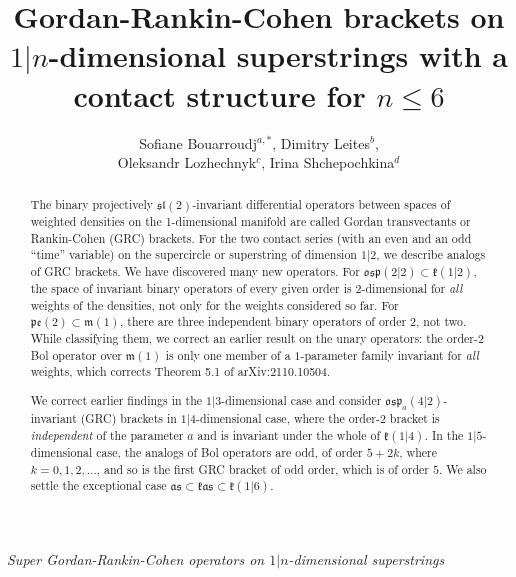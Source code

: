 \documentclass[12pt,a4paper]{amsart}
\title[GRC brackets on $1|n$-dimensional superstrings]{Gordan-Rankin-Cohen  brackets on $1|n$-dimensional superstrings with a contact structure for $n\leq 6$}
\author{Sofiane Bouarroudj${}^{a, *}$, Dimitry Leites${}^{b}$,\\ Oleksandr Lozhechnyk${}^c$, Irina Shchepochkina${}^{d}$}
\theoremstyle{thm}
\theoremstyle{definition}
\begin{document}
\begin{abstract}The binary projectively $\mathfrak{sl}(2)$-invariant differential operators between spaces of weighted densities on the 1-dimensional manifold are called Gordan transvectants or Rankin-Cohen (GRC) brackets. For the two contact series (with an even and an odd ``time'' variable) on the supercircle or superstring of dimension $1|2$, we describe analogs of GRC brackets. %
We have discovered many new operators. For $\mathfrak{osp}(2|2)\subset\mathfrak{k}(1|2)$, the space of invariant binary operators of every given order is $2$-dimensional for \textit{all} weights of the densities, not only for the weights considered so far. For $\mathfrak{pe}(2)\subset\mathfrak{m}(1)$, there are three independent binary operators of order $2$, not two. While classifying them, we correct an earlier result on the unary operators: the order-$2$ Bol operator over $\mathfrak{m}(1)$ is only one member of a $1$-parameter family invariant for \textit{all} weights, which corrects Theorem 5.1 of arXiv:2110.10504. 

We correct earlier findings in the $1|3$-dimensional case and consider $\mathfrak{osp}_a(4|2)$-invariant (GRC) brackets in $1|4$-dimensional case, where the order-$2$ bracket is \textit{independent} of the parameter $a$ and is invariant under the whole of $\mathfrak{k}(1|4)$. 
In the $1|5$-dimensional case, 
the analogs of Bol operators are odd, of order $5+2k$, where $k=0,1,2,\dots$, and so is the first GRC bracket of odd order, which is of order $5$.
We also settle the exceptional case $\mathfrak{as}\subset\mathfrak{kas}\subset\mathfrak{k}(1|6)$. \end{abstract}


 \makeatletter
{}
\makeatother


\maketitle

{{\itshape Super Gordan-Rankin-Cohen  operators on $1|n$-dimensional superstrings}} %
\end{document}
